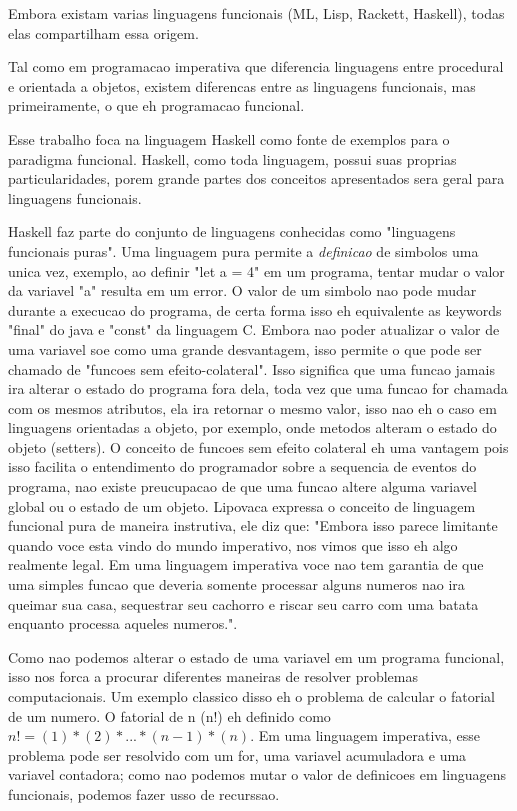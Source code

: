 
Embora existam varias linguagens funcionais (ML, Lisp, Rackett, Haskell), todas elas compartilham essa origem.

Tal como em programacao imperativa que diferencia linguagens entre procedural e orientada a objetos, existem diferencas entre as linguagens funcionais, mas primeiramente, o que eh programacao funcional.

Esse trabalho foca na linguagem Haskell como fonte de exemplos para o paradigma funcional.
Haskell, como toda linguagem, possui suas proprias particularidades, porem grande partes dos conceitos apresentados sera geral para linguagens funcionais.

Haskell faz parte do conjunto de linguagens conhecidas como "linguagens funcionais puras".
Uma linguagem pura permite a \emph{definicao} de simbolos uma unica vez, exemplo, ao definir "let a = 4" em um programa, tentar mudar o valor da variavel "a" resulta em um error.
O valor de um simbolo nao pode mudar durante a execucao do programa, de certa forma isso eh equivalente as keywords "final" do java e "const" da linguagem C.
Embora nao poder atualizar o valor de uma variavel soe como uma grande desvantagem, isso permite o que pode ser chamado de "funcoes sem efeito-colateral".
Isso significa que uma funcao jamais ira alterar o estado do programa fora dela, toda vez que uma funcao for chamada com os mesmos atributos, ela ira retornar o mesmo valor, isso nao eh o caso em linguagens orientadas a objeto, por exemplo, onde metodos alteram o estado do objeto (setters).
O conceito de funcoes sem efeito colateral eh uma vantagem pois isso facilita o entendimento do programador sobre a sequencia de eventos do programa, nao existe preucupacao de que uma funcao altere alguma variavel global ou o estado de um objeto.
Lipovaca expressa o conceito de linguagem funcional pura de maneira instrutiva, ele diz que:
"Embora isso parece limitante quando voce esta vindo do mundo imperativo, nos vimos que isso eh algo realmente legal. Em uma linguagem imperativa voce nao tem garantia de que uma simples funcao que deveria somente processar alguns numeros nao ira queimar sua casa, sequestrar seu cachorro e riscar seu carro com uma batata enquanto processa aqueles numeros.".

Como nao podemos alterar o estado de uma variavel em um programa funcional, isso nos forca a procurar diferentes maneiras de resolver problemas computacionais.
Um exemplo classico disso eh o problema de calcular o fatorial de um numero.
O fatorial de n (n!) eh definido como $ n! = (1)*(2)*...*(n-1)*(n)$.
Em uma linguagem imperativa, esse problema pode ser resolvido com um for, uma variavel acumuladora e uma variavel contadora; como nao podemos mutar o valor de definicoes em linguagens funcionais, podemos fazer usso de recurssao.

